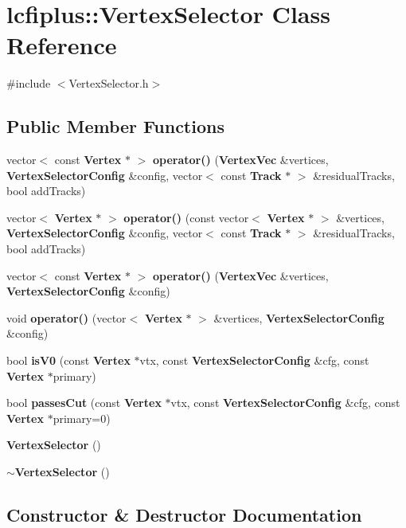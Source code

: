 \section{lcfiplus\-:\-:Vertex\-Selector Class Reference}
\label{classlcfiplus_1_1VertexSelector}


{\ttfamily \#include $<$Vertex\-Selector.\-h$>$}

\subsection*{Public Member Functions}
\begin{DoxyCompactItemize}
\item 
vector$<$ const {\bf Vertex} $\ast$ $>$ {\bf operator()} ({\bf Vertex\-Vec} \&vertices, {\bf Vertex\-Selector\-Config} \&config, vector$<$ const {\bf Track} $\ast$ $>$ \&residual\-Tracks, bool add\-Tracks)
\item 
vector$<$ {\bf Vertex} $\ast$ $>$ {\bf operator()} (const vector$<$ {\bf Vertex} $\ast$ $>$ \&vertices, {\bf Vertex\-Selector\-Config} \&config, vector$<$ const {\bf Track} $\ast$ $>$ \&residual\-Tracks, bool add\-Tracks)
\item 
vector$<$ const {\bf Vertex} $\ast$ $>$ {\bf operator()} ({\bf Vertex\-Vec} \&vertices, {\bf Vertex\-Selector\-Config} \&config)
\item 
void {\bf operator()} (vector$<$ {\bf Vertex} $\ast$ $>$ \&vertices, {\bf Vertex\-Selector\-Config} \&config)
\item 
bool {\bf is\-V0} (const {\bf Vertex} $\ast$vtx, const {\bf Vertex\-Selector\-Config} \&cfg, const {\bf Vertex} $\ast$primary)
\item 
bool {\bf passes\-Cut} (const {\bf Vertex} $\ast$vtx, const {\bf Vertex\-Selector\-Config} \&cfg, const {\bf Vertex} $\ast$primary=0)
\item 
{\bf Vertex\-Selector} ()
\item 
{\bf $\sim$\-Vertex\-Selector} ()
\end{DoxyCompactItemize}


\subsection{Constructor \& Destructor Documentation}
